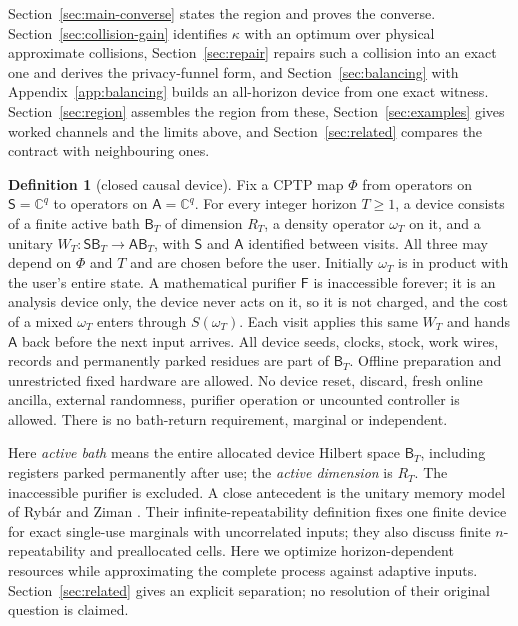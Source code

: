 \documentclass[11pt,a4paper]{article}
\numberwithin{equation}{section}
\theoremstyle{plain}
\theoremstyle{definition}
\newtheorem{definition}[theorem]{Definition}
\newcommand{\rg}[1]{\mathsf{#1}}
\newcommand{\CC}{\mathbb{C}}
\begin{document}
Section~\ref{sec:main-converse} states the region and proves the converse.
Section~\ref{sec:collision-gain} identifies $\kappa$ with an optimum over
physical approximate collisions, Section~\ref{sec:repair} repairs such a
collision into an exact one and derives the privacy-funnel form, and
Section~\ref{sec:balancing} with Appendix~\ref{app:balancing} builds an
all-horizon device from one exact witness. Section~\ref{sec:region} assembles
the region from these, Section~\ref{sec:examples} gives worked channels and
the limits above, and Section~\ref{sec:related} compares the contract with
neighbouring ones.

\begin{definition}[closed causal device]
\label{def:closed-device}
Fix a CPTP map $\Phi$ from operators on $\rg{S}=\CC^q$ to operators on
$\rg{A}=\CC^q$. For every integer horizon $T\ge 1$, a device consists of a
finite active bath $\rg{B}_T$ of dimension $R_T$, a density operator
$\omega_T$ on it, and a unitary $W_T:\rg{S}\rg{B}_T\to\rg{A}\rg{B}_T$, with
$\rg{S}$ and $\rg{A}$ identified between visits. All three may depend on
$\Phi$ and $T$ and are chosen before the user. Initially $\omega_T$ is in
product with the user's entire state. A mathematical purifier $\rg{F}$ is
inaccessible forever; it is an analysis device only, the device never acts on
it, so it is not charged, and the cost of a mixed $\omega_T$ enters through
$S(\omega_T)$. Each visit applies this same $W_T$ and hands $\rg{A}$
back before the next input arrives. All device seeds, clocks, stock, work
wires, records and permanently parked residues are part of $\rg{B}_T$.
Offline preparation and unrestricted fixed hardware are allowed. No device
reset, discard, fresh online ancilla, external randomness, purifier operation
or uncounted controller is allowed. There is no bath-return requirement,
marginal or independent.
\end{definition}

Here \emph{active bath} means the entire allocated device Hilbert space
$\rg{B}_T$, including registers parked permanently after use; the
\emph{active dimension} is $R_T$. The inaccessible purifier is excluded. A
close antecedent is the unitary memory model of Ryb\'ar and Ziman
\cite[sections II--III]{RybarZiman2008}. Their infinite-repeatability definition
fixes one finite device for exact single-use marginals with uncorrelated inputs;
they also discuss finite $n$-repeatability and preallocated cells. Here we optimize
horizon-dependent resources while approximating the complete process against
adaptive inputs. Section~\ref{sec:related} gives an explicit separation; no
resolution of their original question is claimed.
\end{document}
